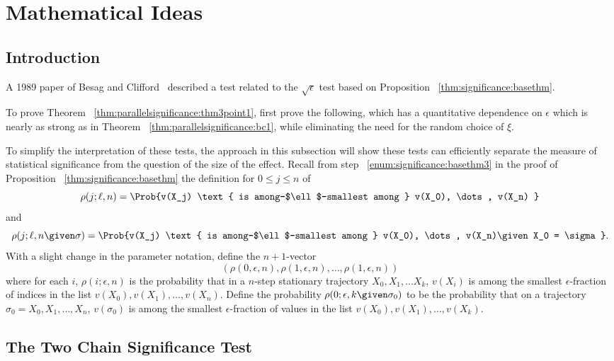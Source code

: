 \documentclass[12pt]{article}
\begin{document}
\section*{Mathematical Ideas}

\subsection*{Introduction}

A 1989 paper of Besag and Clifford~\cite{besag89}
described a test related to the \( \sqrt{\epsilon} \)
test based on Proposition~%
\ref{thm:significance:basethm}.

\begin{remark}
    To prove Theorem~%
    \ref{thm:parallelsignificance:thm3point1}, first prove the following, which
    has a quantitative dependence on \( \epsilon \) which is nearly as
    strong as in Theorem~%
    \ref{thm:parallelsignificance:bc1}, while eliminating the need for the
    random choice of \( \xi \).
\end{remark}

To simplify the interpretation of these tests, the approach in this
subsection will show these tests can efficiently separate the measure of
statistical significance from the question of the size of the
effect.  Recall from step~%
\ref{enum:significance:basethm3} in the proof of
Proposition~%
\ref{thm:significance:basethm} the definition for \( 0 \le j \le n \) of
\[
    \rho(j; \ell, n) = \Prob{v(X_j) \text{ is among-$\ell$-smallest
    among } v(X_0), \dots, v(X_n) }
\] and
\[
  \rho(j; \ell, n \given \sigma) = \Prob{v(X_j)
    \text{ is among-$\ell$-smallest among } v(X_0), \dots, v(X_n)%
    \given X_0 = \sigma }.
\] With a slight change in the parameter notation, define the \( n+1 \)-vector
\[ (\rho(0, \epsilon, n), \rho(1, \epsilon, n), \dots, \rho(1, \epsilon,
  n)) \]
where for each \( i \), \( \rho(i; \epsilon, n) \) is the
probability that in a \( n \)-step stationary trajectory \( X_0, X_1,
\dots X_k \), \( v(X_i) \) is among the smallest \( \epsilon
\)-fraction of indices
in the list \( v(X_0), v(X_1), \dots, v(X_n) \).  Define the probability
\( \rho(0; \epsilon, k \given \sigma_0) \) to be the probability that on a
trajectory \( \sigma_0 = X_0, X_1, \dots, X_n \), \( v(\sigma_0) \) is
among the smallest \( \epsilon \)-fraction of values in the list \( v(X_0),
v(X_1), \dots, v(X_k) \).

\subsection*{The Two Chain Significance Test}
\end{document}
